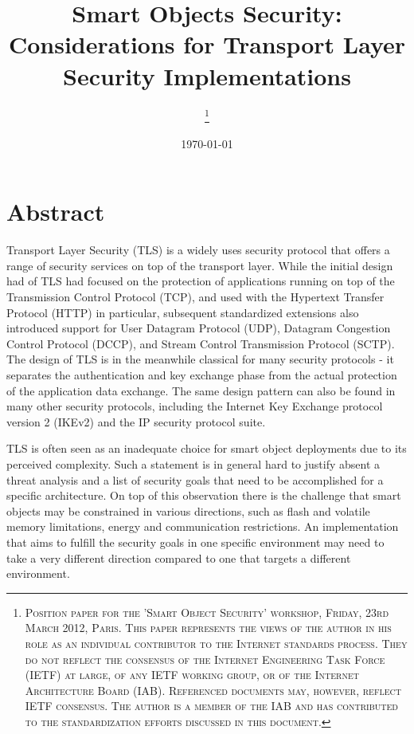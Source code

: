 \documentclass[a4paper, 10pt]{IEEEtran}
\begin{document}
\title{Smart Objects Security: Considerations for Transport Layer Security Implementations}

\author{
\thanks{\textsc{
Position paper for the 'Smart Object Security' workshop, Friday, 23rd March 2012, Paris. This paper represents the views of the author in his role as an individual contributor to the Internet standards process. They do not reflect the consensus of the Internet Engineering Task Force (IETF) at large, of any IETF working group, or of the Internet Architecture Board (IAB). Referenced documents may, however, reflect IETF consensus. The author is a member of the IAB and has contributed to the standardization efforts discussed in this document.}}
}

\date{\today}

\maketitle

\section{Abstract}

Transport Layer Security (TLS) is a widely uses security protocol that offers a range of security services on top of the transport layer. While the initial design had of TLS had focused on the protection of applications running on top of the Transmission Control Protocol (TCP), and used with the Hypertext Transfer Protocol (HTTP) in particular, subsequent standardized extensions also introduced support for User Datagram Protocol (UDP), Datagram Congestion Control Protocol (DCCP), and Stream Control Transmission Protocol (SCTP). The design of TLS is in the meanwhile classical for many security protocols - it separates the authentication and key exchange phase from the actual protection of the application data exchange. The same design pattern can also be found in many other security protocols, including the Internet Key Exchange protocol version 2 (IKEv2) and the IP security protocol suite. 

TLS is often seen as an inadequate choice for smart object deployments due to its perceived complexity. Such a statement is in general hard to justify absent a threat analysis and a list of security goals that need to be accomplished for a specific architecture. On top of this observation there is the challenge that smart objects may be constrained in various directions, such as flash and volatile memory limitations, energy and communication restrictions. An implementation that aims to fulfill the security goals in one specific environment may need to take a very different direction compared to one that targets a different environment. 
\end{document}
